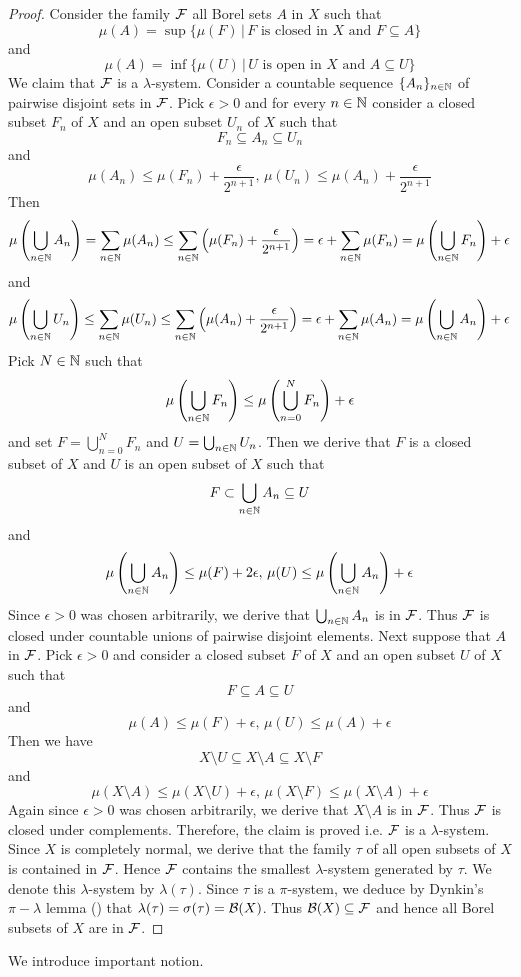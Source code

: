 \begin{proof}
Consider the family ${\mathcal F}$ all Borel sets $A$ in $X$ such that
$$\mu(A) = \sup \big\{\mu(F)\,\big|\,F\mbox{ is closed in }X\mbox{ and }F\subseteq A\big\}$$
and
$$\mu(A) = \inf \big\{\mu(U)\,\big|\,U\mbox{ is open in }X\mbox{ and }A\subseteq U\big\}$$
We claim that ${\mathcal F}$ is a $\lambda$-system. Consider a countable sequence $\{A_n\}_{n\in {\mathbb N}}$ of pairwise disjoint sets in ${\mathcal F}$. Pick $\epsilon > 0$ and for every $n\in {\mathbb N}$ consider a closed subset $F_n$ of $X$ and an open subset $U_n$ of $X$ such that
$$F_n\subseteq A_n\subseteq U_n$$
and
$$\mu(A_n) \leq \mu(F_n) + \frac{\epsilon}{2^{n+1}},\,\mu(U_n) \leq \mu(A_n) + \frac{\epsilon}{2^{n+1}}$$
Then
$$\mu\left(\bigcup_{n\in {\mathbb N}} A_n\right) = \sum_{n\in {\mathbb N}}\mu(A_n) \leq  \sum_{n\in {\mathbb N}}\left(\mu(F_n) + \frac{\epsilon}{2^{n+1}}\right) = \epsilon  + \sum_{n\in {\mathbb N}}\mu(F_n) = \mu\left(\bigcup_{n\in {\mathbb N}}F_n\right) + \epsilon$$
and
$$\mu\left(\bigcup_{n\in {\mathbb N}} U_n\right) \leq \sum_{n\in {\mathbb N}}\mu(U_n) \leq  \sum_{n\in {\mathbb N}}\left(\mu(A_n) + \frac{\epsilon}{2^{n+1}}\right) = \epsilon  + \sum_{n\in {\mathbb N}}\mu(A_n) = \mu\left(\bigcup_{n\in {\mathbb N}}A_n\right) + \epsilon$$
Pick $N\in {\mathbb N}$ such that
$$\mu\left(\bigcup_{n\in {\mathbb N}}F_n\right) \leq \mu\left(\bigcup_{n=0}^NF_n\right) + \epsilon$$
and set $F = \bigcup_{n=0}^NF_n$ and $U = \bigcup_{n\in {\mathbb N}}U_n$. Then we derive that $F$ is a closed subset of $X$ and $U$ is an open subset of $X$ such that
$$F\subset \bigcup_{n\in {\mathbb N}}A_n\subseteq U$$
and
$$\mu\left(\bigcup_{n\in {\mathbb N}}A_n\right) \leq \mu(F) + 2\epsilon,\,\mu(U)\leq \mu\left(\bigcup_{n\in {\mathbb N}}A_n\right) + \epsilon$$
Since $\epsilon > 0$ was chosen arbitrarily, we derive that $\bigcup_{n\in {\mathbb N}}A_n$ is in ${\mathcal F}$. Thus ${\mathcal F}$ is closed under countable unions of pairwise disjoint elements. Next suppose that $A$ in ${\mathcal F}$.  Pick $\epsilon > 0$ and consider a closed subset $F$ of $X$ and an open subset $U$ of $X$ such that
$$F\subseteq A\subseteq U$$
and
$$\mu(A) \leq \mu(F) + \epsilon,\,\mu(U) \leq \mu(A) + \epsilon$$
Then we have
$$X\setminus U\subseteq X\setminus A\subseteq X\setminus F$$
and
$$\mu(X\setminus A) \leq \mu(X\setminus U) + \epsilon,\,\mu(X\setminus F) \leq \mu(X\setminus A) + \epsilon$$
Again since $\epsilon > 0$ was chosen arbitrarily, we derive that $X\setminus A$ is in ${\mathcal F}$. Thus ${\mathcal F}$ is closed under complements. Therefore, the claim is proved i.e. ${\mathcal F}$ is a $\lambda$-system. Since $X$ is completely normal, we derive that the family $\tau$ of all open subsets of $X$ is contained in ${\mathcal F}$. Hence ${\mathcal F}$ contains the smallest $\lambda$-system generated by $\tau$. We denote this $\lambda$-system by $\lambda(\tau)$. Since $\tau$ is a $\pi$-system, we deduce by Dynkin's $\pi-\lambda$ lemma ({\cite[Theorem 1.4]{Introduction_to_measure_theory}}) that $\lambda(\tau) = \sigma(\tau) = {\mathcal B}(X)$. Thus ${\mathcal B}(X)\subseteq {\mathcal F}$ and hence all Borel subsets of $X$ are in ${\mathcal F}$.
\end{proof}
\noindent
We introduce important notion.

